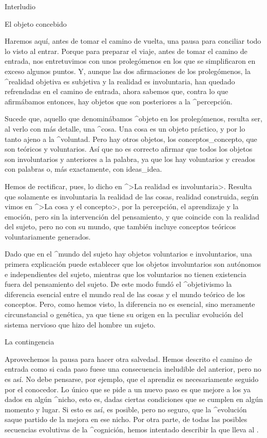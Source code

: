 
\Part Interludio

\Section El objeto concebido

Haremos aquí, antes de tomar el camino de vuelta, una pausa para
conciliar todo lo visto al entrar. Porque para preparar el viaje, antes
de tomar el camino de entrada, nos entretuvimos con unos prolegómenos en
los que se simplificaron en exceso algunos puntos. Y, aunque las dos
afirmaciones de los prolegómenos, la ^{realidad} objetiva es subjetiva y
la realidad es involuntaria, han quedado refrendadas en el camino de
entrada, ahora sabemos que, contra lo que afirmábamos entonces, hay
objetos que son posteriores a la ^{percepción}.

Sucede que, aquello que denominábamos ^{objeto} en los prolegómenos,
resulta ser, al verlo con más detalle, una ^{cosa}. Una cosa es un
objeto práctico, y por lo tanto ajeno a la ^{voluntad}. Pero hay otros
objetos, los conceptos_{concepto}, que son teóricos y voluntarios. Así
que no es correcto afirmar que todos los objetos son involuntarios y
anteriores a la palabra, ya que los hay voluntarios y creados con
palabras o, más exactamente, con ideas_{idea}.

Hemos de rectificar, pues, lo dicho en ^>La realidad es involuntaria>.
Resulta que solamente es involuntaria la realidad de las cosas, realidad
construida, según vimos en ^>La cosa y el concepto>, por la percepción,
el aprendizaje y la emoción, pero sin la intervención del pensamiento, y
que coincide con la realidad del sujeto, pero no con su mundo, que
también incluye conceptos teóricos voluntariamente generados.

Dado que en el ^{mundo} del sujeto hay objetos voluntarios e
involuntarios, una primera explicación puede establecer que los objetos
involuntarios son autónomos e independientes del sujeto, mientras que
los voluntarios no tienen existencia fuera del pensamiento del sujeto.
De este modo fundó el ^{objetivismo} la diferencia esencial entre el
mundo real de las cosas y el mundo teórico de los conceptos. Pero, como
hemos visto, la diferencia no es esencial, sino meramente circunstancial
o genética, ya que tiene su origen en la peculiar evolución del sistema
nervioso que hizo del hombre un sujeto.


\Section La contingencia

Aprovechemos la pausa para hacer otra salvedad. Hemos descrito el
camino de entrada como si cada paso fuese una consecuencia ineludible
del anterior, pero no es así. No debe pensarse, por ejemplo, que el
aprendiz es necesariamente seguido por el conocedor. Lo único que se
pide a un nuevo paso es que mejore a los ya dados en algún ^{nicho},
esto es, dadas ciertas condiciones que se cumplen en algún momento y
lugar. Si esto es así, es posible, pero no seguro, que la ^{evolución}
saque partido de la mejora en ese nicho. Por otra parte, de todas las
posibles secuencias evolutivas de la ^{cognición}, hemos intentado
describir la que lleva al .

